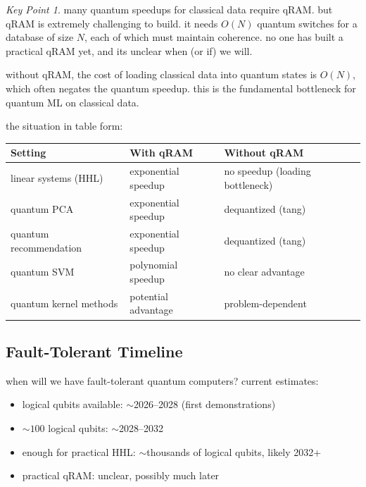 \documentclass[11pt,a4paper]{article}
\theoremstyle{definition}
\theoremstyle{remark}
\newtheorem*{keypoint}{Key Point}
\begin{document}
\begin{keypoint}
many quantum speedups for classical data require qRAM. but qRAM is extremely challenging to build. it needs $O(N)$ quantum switches for a database of size $N$, each of which must maintain coherence. no one has built a practical qRAM yet, and its unclear when (or if) we will.
\end{keypoint}

without qRAM, the cost of loading classical data into quantum states is $O(N)$, which often negates the quantum speedup. this is the fundamental bottleneck for quantum ML on classical data.

the situation in table form:

\begin{center}
\renewcommand{\arraystretch}{1.4}
\begin{tabular}{|p{4cm}|p{4cm}|p{4cm}|}
\hline
\textbf{Setting} & \textbf{With qRAM} & \textbf{Without qRAM} \\
\hline
linear systems (HHL) & exponential speedup & no speedup (loading bottleneck) \\
\hline
quantum PCA & exponential speedup & dequantized (tang) \\
\hline
quantum recommendation & exponential speedup & dequantized (tang) \\
\hline
quantum SVM & polynomial speedup & no clear advantage \\
\hline
quantum kernel methods & potential advantage & problem-dependent \\
\hline
\end{tabular}
\end{center}

\subsection{Fault-Tolerant Timeline}

when will we have fault-tolerant quantum computers? current estimates:
\begin{itemize}[nosep]
    \item logical qubits available: $\sim$2026--2028 (first demonstrations)
    \item $\sim 100$ logical qubits: $\sim$2028--2032
    \item enough for practical HHL: $\sim$thousands of logical qubits, likely 2032+
    \item practical qRAM: unclear, possibly much later
\end{itemize}
\end{document}
